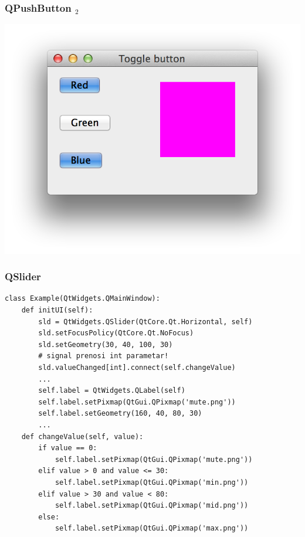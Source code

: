 \documentclass[utf8,compress]{beamer}
\begin{document}
\begin{frame}[fragile]
  \frametitle{QPushButton $_2$}
\begin{center}
\includegraphics[scale=0.5]{pyqt13.png}
\end{center}
\end{frame}

\begin{frame}
  \frametitle{QSlider}
\begin{verbatim}
class Example(QtWidgets.QMainWindow):
    def initUI(self):
        sld = QtWidgets.QSlider(QtCore.Qt.Horizontal, self)
        sld.setFocusPolicy(QtCore.Qt.NoFocus)
        sld.setGeometry(30, 40, 100, 30)
        # signal prenosi int parametar!
        sld.valueChanged[int].connect(self.changeValue)
        ...
        self.label = QtWidgets.QLabel(self)
        self.label.setPixmap(QtGui.QPixmap('mute.png'))
        self.label.setGeometry(160, 40, 80, 30)
        ...
    def changeValue(self, value):
        if value == 0:
            self.label.setPixmap(QtGui.QPixmap('mute.png'))
        elif value > 0 and value <= 30:
            self.label.setPixmap(QtGui.QPixmap('min.png'))
        elif value > 30 and value < 80:
            self.label.setPixmap(QtGui.QPixmap('mid.png'))
        else:
            self.label.setPixmap(QtGui.QPixmap('max.png'))
\end{verbatim}
\end{frame}
\end{document}
